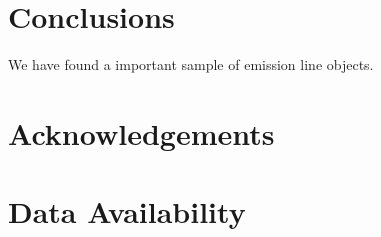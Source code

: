 \documentclass[fleqn,usenatbib]{mnras}
\begin{document}



\section{Conclusions}

We have found a important sample of emission line objects.

\section*{Acknowledgements}


\section*{Data Availability}






\end{document}
